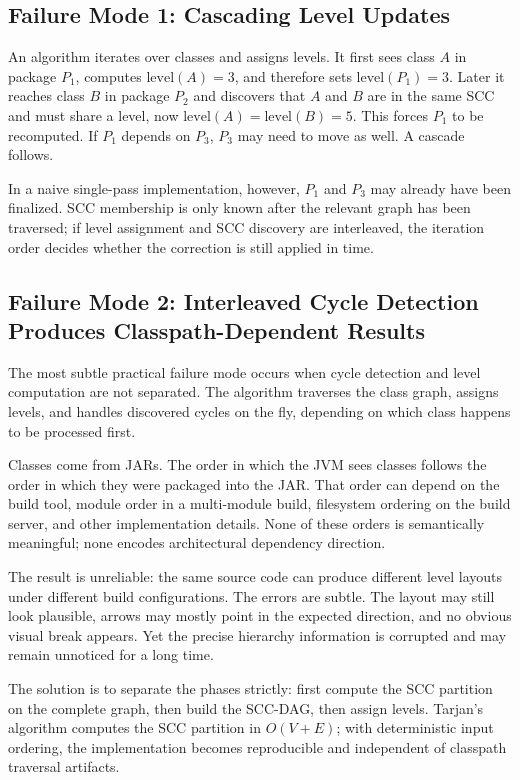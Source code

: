 \documentclass[a4paper,twoside]{article}
\begin{document}
\subsection*{Failure Mode 1: Cascading Level Updates}

An algorithm iterates over classes and assigns levels. It first sees class $A$
in package $P_1$, computes $\text{level}(A)=3$, and therefore sets
$\text{level}(P_1)=3$. Later it reaches class $B$ in package $P_2$ and
discovers that $A$ and $B$ are in the same SCC and must share a level, now
$\text{level}(A)=\text{level}(B)=5$. This forces $P_1$ to be recomputed. If
$P_1$ depends on $P_3$, $P_3$ may need to move as well. A cascade follows.

In a naive single-pass implementation, however, $P_1$ and $P_3$ may already have
been finalized. SCC membership is only known after the relevant graph has been
traversed; if level assignment and SCC discovery are interleaved, the iteration
order decides whether the correction is still applied in time.

\subsection*{Failure Mode 2: Interleaved Cycle Detection Produces
Classpath-Dependent Results}

The most subtle practical failure mode occurs when cycle detection and level
computation are not separated. The algorithm traverses the class graph, assigns
levels, and handles discovered cycles on the fly, depending on which class
happens to be processed first.

Classes come from JARs. The order in which the JVM sees classes follows the
order in which they were packaged into the JAR. That order can depend on the
build tool, module order in a multi-module build, filesystem ordering on the
build server, and other implementation details. None of these orders is
semantically meaningful; none encodes architectural dependency direction.

The result is unreliable: the same source code can produce different level
layouts under different build configurations. The errors are subtle. The layout
may still look plausible, arrows may mostly point in the expected direction,
and no obvious visual break appears. Yet the precise hierarchy information is
corrupted and may remain unnoticed for a long time.

The solution is to separate the phases strictly: first compute the SCC
partition on the complete graph, then build the SCC-DAG, then assign levels.
Tarjan's algorithm computes the SCC partition in $O(V+E)$; with deterministic
input ordering, the implementation becomes reproducible and independent of
classpath traversal artifacts.
\end{document}
